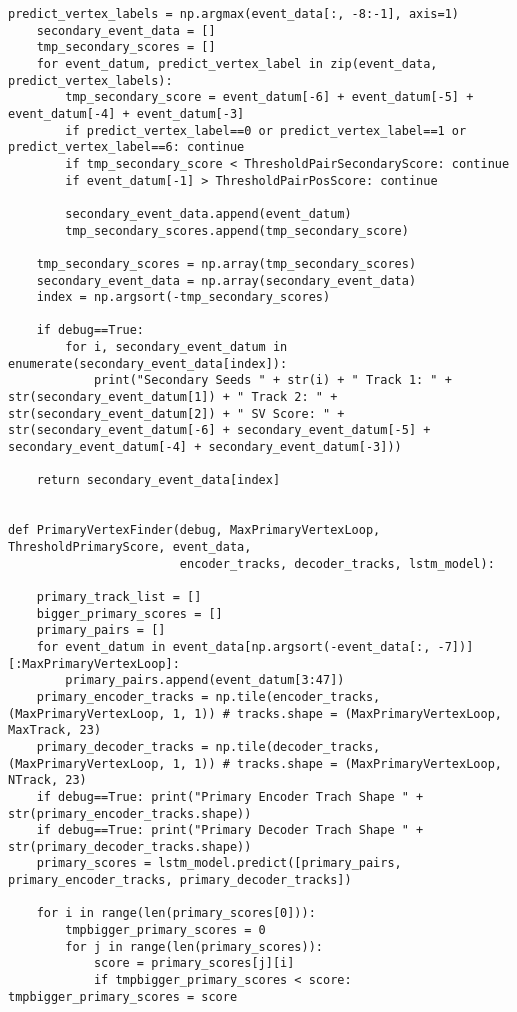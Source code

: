 \begin{lstlisting}[caption=崩壊点検出アルゴリズム用関数,label=VertexFinder1]
    predict_vertex_labels = np.argmax(event_data[:, -8:-1], axis=1)
    secondary_event_data = []
    tmp_secondary_scores = []
    for event_datum, predict_vertex_label in zip(event_data, predict_vertex_labels):
        tmp_secondary_score = event_datum[-6] + event_datum[-5] + event_datum[-4] + event_datum[-3]
        if predict_vertex_label==0 or predict_vertex_label==1 or  predict_vertex_label==6: continue
        if tmp_secondary_score < ThresholdPairSecondaryScore: continue
        if event_datum[-1] > ThresholdPairPosScore: continue
	
        secondary_event_data.append(event_datum)
        tmp_secondary_scores.append(tmp_secondary_score)
        
    tmp_secondary_scores = np.array(tmp_secondary_scores)
    secondary_event_data = np.array(secondary_event_data)
    index = np.argsort(-tmp_secondary_scores)

    if debug==True: 
        for i, secondary_event_datum in enumerate(secondary_event_data[index]):
            print("Secondary Seeds " + str(i) + " Track 1: " + str(secondary_event_datum[1]) + " Track 2: " + str(secondary_event_datum[2]) + " SV Score: " + str(secondary_event_datum[-6] + secondary_event_datum[-5] + secondary_event_datum[-4] + secondary_event_datum[-3]))
    
    return secondary_event_data[index]


def PrimaryVertexFinder(debug, MaxPrimaryVertexLoop, ThresholdPrimaryScore, event_data, 
                        encoder_tracks, decoder_tracks, lstm_model):

    primary_track_list = []
    bigger_primary_scores = []
    primary_pairs = []
    for event_datum in event_data[np.argsort(-event_data[:, -7])][:MaxPrimaryVertexLoop]:
        primary_pairs.append(event_datum[3:47])
    primary_encoder_tracks = np.tile(encoder_tracks, (MaxPrimaryVertexLoop, 1, 1)) # tracks.shape = (MaxPrimaryVertexLoop, MaxTrack, 23)
    primary_decoder_tracks = np.tile(decoder_tracks, (MaxPrimaryVertexLoop, 1, 1)) # tracks.shape = (MaxPrimaryVertexLoop, NTrack, 23)
    if debug==True: print("Primary Encoder Trach Shape " + str(primary_encoder_tracks.shape))
    if debug==True: print("Primary Decoder Trach Shape " + str(primary_decoder_tracks.shape))
    primary_scores = lstm_model.predict([primary_pairs, primary_encoder_tracks, primary_decoder_tracks])

    for i in range(len(primary_scores[0])): 
        tmpbigger_primary_scores = 0
        for j in range(len(primary_scores)):
            score = primary_scores[j][i]
            if tmpbigger_primary_scores < score: tmpbigger_primary_scores = score
        

\end{lstlisting}
